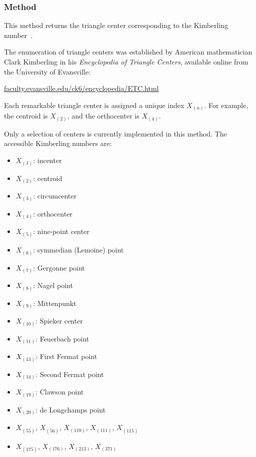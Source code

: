\subsubsection{Method }
\label{ssub:method_triangle_kimberling_n}

This method returns the triangle center corresponding to the Kimberling number~.

\medskip
\noindent
The enumeration of triangle centers was established by American mathematician Clark Kimberling in his \textit{Encyclopedia of Triangle Centers}, available online from the University of Evansville:
\begin{center}
\href{http://faculty.evansville.edu/ck6/encyclopedia/ETC.html}{faculty.evansville.edu/ck6/encyclopedia/ETC.html}
\end{center}

\noindent
Each remarkable triangle center is assigned a unique index $X_{(n)}$. For example, the centroid is $X_{(2)}$, and the orthocenter is $X_{(4)}$.

\medskip
\noindent
Only a selection of centers is currently implemented in this method. The accessible Kimberling numbers are:
\begin{multicols}{2}
\begin{itemize}
  \item $X_{(1)}$: incenter
  \item $X_{(2)}$: centroid
  \item $X_{(3)}$: circumcenter
  \item $X_{(4)}$: orthocenter
  \item $X_{(5)}$: nine-point center
  \item $X_{(6)}$: symmedian (Lemoine) point
  \item $X_{(7)}$: Gergonne point
  \item $X_{(8)}$: Nagel point
  \item $X_{(9)}$: Mittenpunkt
  \item $X_{(10)}$: Spieker center
  \item $X_{(11)}$: Feuerbach point
  \item $X_{(13)}$: First Fermat point
  \item $X_{(14)}$: Second Fermat point
  \item $X_{(19)}$: Clawson point
  \item $X_{(20)}$: de Longchamps point
  \item $X_{(55)}$, $X_{(56)}$, $X_{(110)}$, $X_{(111)}$, $X_{(115)}$
  \item $X_{(175)}$, $X_{(176)}$, $X_{(213)}$, $X_{(371)}$
\end{itemize}
\end{multicols}

